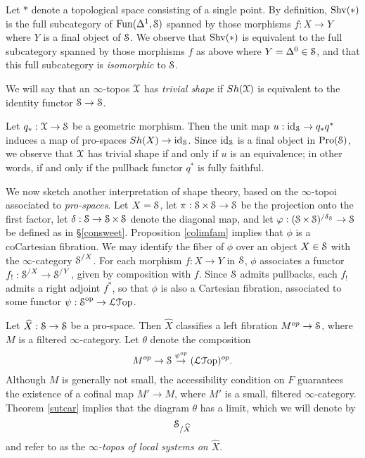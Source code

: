 \begin{remark}\label{surety}
Let $\ast$ denote a topological space consisting of a single point. By definition,
$\operatorname{Shv}(\ast)$ is the full subcategory of $\operatorname{Fun}(\Delta^1,\operatorname{\mathcal{S}})$ spanned by those morphisms
$f: X \rightarrow Y$ where $Y$ is a final object of $\operatorname{\mathcal{S}}$. We observe that $\operatorname{Shv}(\ast)$ is equivalent to the full subcategory spanned by those morphisms $f$ as above where
$Y = \Delta^0 \in \operatorname{\mathcal{S}}$, and that this full subcategory is {\em isomorphic} to $\operatorname{\mathcal{S}}$.
\end{remark}
\begin{definition}
We will say that an $\infty$-topos $\operatorname{\mathcal{X}}$ has {\it trivial shape} if $Sh(\operatorname{\mathcal{X}})$ is equivalent
to the identity functor $\operatorname{\mathcal{S}} \rightarrow \operatorname{\mathcal{S}}$.
\end{definition}

\begin{remark}
Let $q_{\ast}: \operatorname{\mathcal{X}} \rightarrow \operatorname{\mathcal{S}}$ be a geometric morphism. Then the unit map
$u: \operatorname{id}_{\operatorname{\mathcal{S}}} \rightarrow q_{\ast} q^{\ast}$ induces a map of pro-spaces
$Sh(X) \rightarrow \operatorname{id}_{\operatorname{\mathcal{S}}}$. Since $\operatorname{id}_{\operatorname{\mathcal{S}}}$ is a final object in $\operatorname{Pro}(\operatorname{\mathcal{S}})$, 
we observe that $\operatorname{\mathcal{X}}$ has trivial shape if and only if $u$ is an equivalence; in other words, if and only if the pullback functor $q^{\ast}$ is fully faithful.
\end{remark}

We now sketch another interpretation of shape theory, based on the $\infty$-topoi associated
to {\em pro-spaces}. Let $X = \operatorname{\mathcal{S}}$, let $\pi: \operatorname{\mathcal{S}} \times \operatorname{\mathcal{S}} \rightarrow \operatorname{\mathcal{S}}$ be the projection onto the first factor, let $\delta: \operatorname{\mathcal{S}} \rightarrow \operatorname{\mathcal{S}} \times \operatorname{\mathcal{S}}$ denote the diagonal map, and let $\varphi: (\operatorname{\mathcal{S}} \times \operatorname{\mathcal{S}})^{/\delta_{\operatorname{\mathcal{S}}}} \rightarrow \operatorname{\mathcal{S}}$ be defined as in \S \ref{consweet}. Proposition \ref{colimfam} implies that $\phi$ is a coCartesian fibration. We may identify
the fiber of $\phi$ over an object $X \in \operatorname{\mathcal{S}}$ with the $\infty$-category $\operatorname{\mathcal{S}}^{/X}$. For each morphism $f: X \rightarrow Y$ in $\operatorname{\mathcal{S}}$, $\phi$ associates a functor
$f_{!}: \operatorname{\mathcal{S}}^{/X} \rightarrow \operatorname{\mathcal{S}}^{/Y}$, given by composition with $f$.
Since $\operatorname{\mathcal{S}}$ admits pullbacks, each $f_{!}$ admits a right adjoint $f^{\ast}$, so that
$\phi$ is also a Cartesian fibration, associated to some functor
$\psi: \operatorname{\mathcal{S}}^{\operatorname{op}} \rightarrow \operatorname{\mathcal{L}{\mathcal T}op}$.

Let $\widehat{X}: \operatorname{\mathcal{S}} \rightarrow \operatorname{\mathcal{S}}$ be a pro-space. Then $\hat{X}$ classifies a left fibration 
$M^{op} \rightarrow \operatorname{\mathcal{S}}$, where $M$ is a filtered $\infty$-category. 
Let $\theta$ denote the composition
$$ M^{op} \rightarrow \operatorname{\mathcal{S}} \stackrel{\psi^{op}}{\rightarrow} (\operatorname{\mathcal{L}{\mathcal T}op})^{op}.$$
Although $M$ is generally not small, the accessibility condition on $F$ guarantees the existence of a cofinal map $M' \rightarrow M$, where $M'$ is a small, filtered $\infty$-category. Theorem \ref{sutcar} implies that the diagram $\theta$ has a limit, which we will denote by
$$ \operatorname{\mathcal{S}}_{/ \widehat{X} }$$ and refer to as the {\it $\infty$-topos of local systems on $\hat{X}$}.

